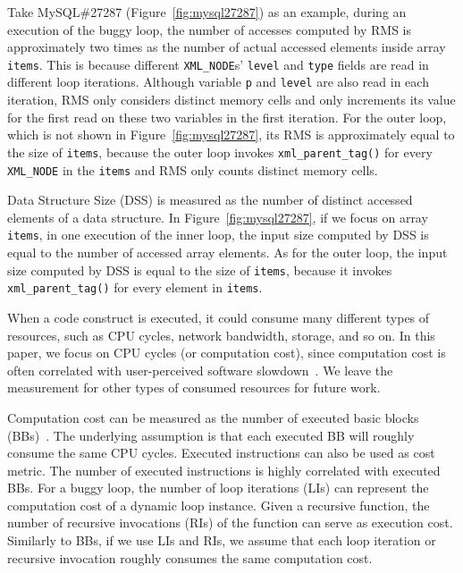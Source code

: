 Take MySQL\#27287 (Figure~\ref{fig:mysql27287}) as an example, 
during an execution of the buggy loop, the number of accesses
computed by RMS is approximately 
two times as the number of actual accessed elements inside array \texttt{items}. 
This is because different \texttt{XML\_NODE}s' \texttt{level} and \texttt{type} 
fields are read in different loop iterations. 
Although variable \texttt{p} and \texttt{level} are also read in each iteration,
RMS only considers distinct memory cells and 
only increments its value for the first read on these 
two variables in the first iteration. 
For the outer loop, which is not shown in Figure~\ref{fig:mysql27287}, 
its RMS is approximately equal to the size of \texttt{items}, 
because the outer loop invokes \texttt{xml\_parent\_tag()} for every
\texttt{XML\_NODE} in the \texttt{items} and RMS only 
counts distinct memory cells. 


Data Structure Size (DSS) is measured as
the number of distinct accessed elements of a data structure.  
%
In Figure~\ref{fig:mysql27287}, if we focus on array \texttt{items},
in one execution of the inner loop, the input size computed by DSS 
is equal to the number of accessed array elements. 
As for the outer loop, the input size computed by DSS  is
equal to the size of  \texttt{items}, because
it invokes \texttt{xml\_parent\_tag()} for every element in \texttt{items}.


When a code construct is executed,
it could consume many different types of resources, 
such as CPU cycles, network bandwidth, storage, and so on.
In this paper, we focus on CPU cycles (or computation cost), 
since computation cost is often correlated 
with user-perceived software slowdown~\cite{SongOOPSLA2014}.
We leave the measurement for other types of 
consumed resources for future work.


Computation cost can be measured 
as the number of executed basic blocks (BBs)~\cite{Aprof1,Aprof2}.
The underlying assumption is that each executed 
BB will roughly consume the same CPU cycles. 
Executed instructions can also be used as cost metric. 
The number of executed instructions is highly correlated with executed BBs.
For a buggy loop, the number of loop iterations (LIs) can represent 
the computation cost of a dynamic loop instance.
Given a recursive function, the number of recursive invocations (RIs) 
of the function can serve as execution cost.
Similarly to BBs, if we use LIs and RIs, 
we assume that each loop iteration or recursive invocation 
roughly consumes the same computation cost. 



